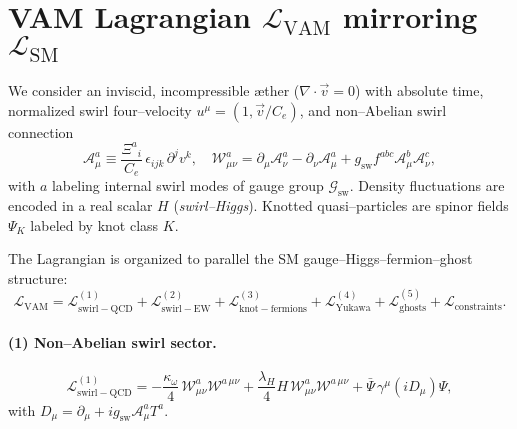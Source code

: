 \documentclass[11pt]{article}
\begin{document}
        \section*{VAM Lagrangian $\mathcal{L}_{\mathrm{VAM}}$ mirroring $\mathcal{L}_{\mathrm{SM}}$}

        We consider an inviscid, incompressible æther ($\nabla\!\cdot\!\vec v = 0$) with absolute time,
        normalized swirl four–velocity $u^\mu = (1,\vec v/C_e)$, and non–Abelian swirl connection
        \begin{equation}
            \mathcal{A}_\mu^a \equiv \frac{\Xi^{a}{}_{i}}{C_e}\,\epsilon_{ijk}\,\partial^j v^k,
            \quad
            \mathcal{W}^a_{\mu\nu} = \partial_\mu\mathcal{A}^a_\nu - \partial_\nu\mathcal{A}^a_\mu
            + g_{\mathrm{sw}} f^{abc} \mathcal{A}^b_\mu \mathcal{A}^c_\nu ,
        \end{equation}
        with $a$ labeling internal swirl modes of gauge group $\mathcal{G}_{\mathrm{sw}}$.
        Density fluctuations are encoded in a real scalar $H$ (\emph{swirl–Higgs}).
        Knotted quasi–particles are spinor fields $\Psi_K$ labeled by knot class $K$.

        The Lagrangian is organized to parallel the SM gauge–Higgs–fermion–ghost structure:
        \begin{equation}
            \mathcal{L}_{\mathrm{VAM}}
            = \mathcal{L}^{(1)}_{\mathrm{swirl-QCD}}
            + \mathcal{L}^{(2)}_{\mathrm{swirl-EW}}
            + \mathcal{L}^{(3)}_{\mathrm{knot-fermions}}
            + \mathcal{L}^{(4)}_{\mathrm{Yukawa}}
            + \mathcal{L}^{(5)}_{\mathrm{ghosts}}
            + \mathcal{L}_{\mathrm{constraints}}.
        \end{equation}

        \paragraph{(1) Non–Abelian swirl sector.}
        \begin{equation}
            \mathcal{L}^{(1)}_{\mathrm{swirl-QCD}}
            = -\frac{\kappa_\omega}{4}\,\mathcal{W}^a_{\mu\nu}\mathcal{W}^{a\,\mu\nu}
            + \frac{\lambda_H}{4} H\,\mathcal{W}^a_{\mu\nu}\mathcal{W}^{a\,\mu\nu}
            + \bar{\Psi}\,\gamma^\mu (iD_\mu)\Psi ,
        \end{equation}
        with $D_\mu = \partial_\mu + i g_{\mathrm{sw}}\mathcal{A}_\mu^a T^a$.
\end{document}
